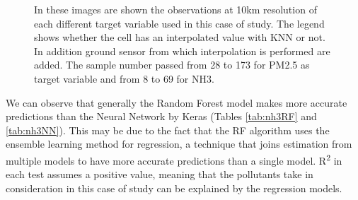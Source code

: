 \begin{figure}[H] 
    \centering
    \hfill%
    \caption{In these images are shown the observations at 10km resolution of each different target variable used in this case of study. The legend shows whether the cell has an interpolated value with KNN or not. In addition ground sensor from which interpolation is performed are added. 
    The sample number passed from 28 to 173 for PM2.5 as target variable and from 8 to 69 for NH3.}
    \label{fig:comparison-sensors}
\end{figure}

We can observe that generally the Random Forest model makes more accurate predictions than the Neural Network by Keras (Tables \ref{tab:nh3RF} and \ref{tab:nh3NN}). 
This may be due to the fact that the RF algorithm uses the ensemble learning method for regression, a technique that joins estimation from multiple models to have more accurate predictions than a single model. 
R\textsuperscript{2} in each test assumes a positive value, meaning that the pollutants take in consideration in this case of study can be explained by the regression models. 
